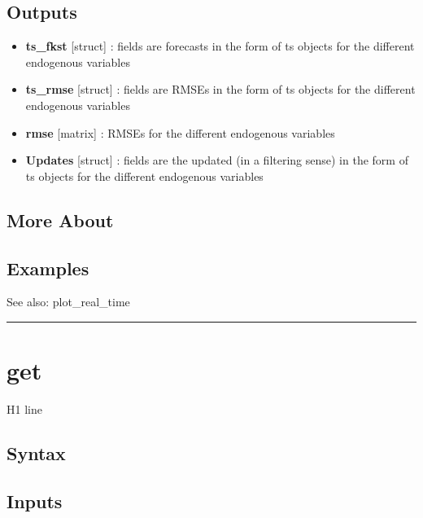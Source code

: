 \documentclass[letterpaper,10pt,english]{sphinxmanual}
\begin{document}
\subsection{Outputs}
\label{classes/models/@dsge/dsge:id63}\begin{itemize}
\item {} 
\textbf{ts\_fkst} {[}struct{]} : fields are forecasts in the form of ts objects
for the different endogenous variables

\item {} 
\textbf{ts\_rmse} {[}struct{]} : fields are RMSEs in the form of ts objects
for the different endogenous variables

\item {} 
\textbf{rmse} {[}matrix{]} : RMSEs for the different endogenous variables

\item {} 
\textbf{Updates} {[}struct{]} : fields are the updated (in a filtering sense) in
the form of ts objects for the different endogenous variables

\end{itemize}


\subsection{More About}
\label{classes/models/@dsge/dsge:id64}

\subsection{Examples}
\label{classes/models/@dsge/dsge:id65}
See also: plot\_real\_time


\bigskip\hrule{}\bigskip



\section{get}
\label{classes/models/@dsge/dsge:id66}\label{classes/models/@dsge/dsge:get}
H1 line


\subsection{Syntax}
\label{classes/models/@dsge/dsge:id67}

\subsection{Inputs}
\label{classes/models/@dsge/dsge:id68}
\end{document}
